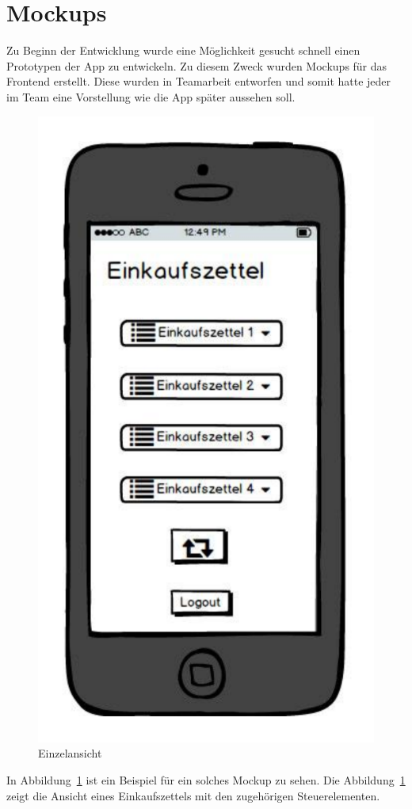 \documentclass[10pt, conference, compsocconf]{IEEEtran}
\begin{document}
\section{Mockups}
Zu Beginn der Entwicklung wurde eine M\"oglichkeit gesucht schnell einen Prototypen der App zu entwickeln.
Zu diesem Zweck wurden Mockups f\"ur das Frontend erstellt. 
Diese wurden in Teamarbeit entworfen und somit hatte jeder im Team eine Vorstellung wie die App sp\"ater aussehen soll.
\begin{figure}[h!]
	\centering
	\includegraphics[scale=0.3]{./Bilder_Zeichnungen/Uebersicht.pdf}
	\caption{Einzelansicht}
	\label{fig:Mockup_Einzelansicht}
\end{figure}
In Abbildung~\ref{fig:Mockup_Einzelansicht} ist ein Beispiel f\"ur ein solches Mockup zu sehen. Die Abbildung~\ref{fig:Mockup_Einzelansicht} zeigt die Ansicht eines Einkaufszettels mit den zugeh\"origen Steuerelementen.
\end{document}
